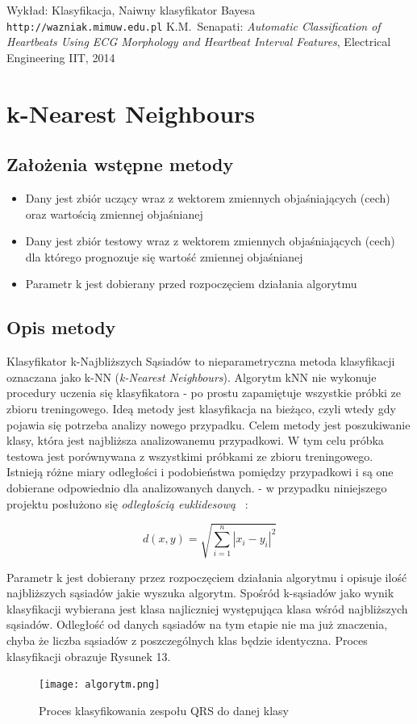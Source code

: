 \documentclass[[10pt,a4paper]{article}
\begin{document}
\begin{thebibliography}{99}
 Wykład: Klasyfikacja, Naiwny klasyfikator Bayesa
\\\texttt{http://wazniak.mimuw.edu.pl}
 K.M.~Senapati:
\emph{Automatic Classification of Heartbeats Using ECG Morphology and Heartbeat Interval Features}, Electrical Engineering IIT, 2014
\end{thebibliography}

\newpage
\section{k-Nearest Neighbours}
\subsection{Założenia wstępne metody} 
\begin{itemize}
\item Dany jest zbiór uczący wraz z wektorem zmiennych objaśniających (cech) oraz wartością zmiennej objaśnianej
\item Dany jest zbiór testowy wraz z wektorem zmiennych objaśniających (cech) dla którego prognozuje się wartość zmiennej objaśnianej
\item Parametr k jest dobierany przed rozpoczęciem działania algorytmu
\end{itemize}

\subsection{Opis metody}
Klasyfikator k-Najbliższych Sąsiadów to nieparametryczna metoda klasyfikacji oznaczana jako k-NN (\emph{k-Nearest Neighbours}). Algorytm kNN nie wykonuje procedury uczenia się klasyfikatora - po prostu zapamiętuje wszystkie próbki ze zbioru treningowego. Ideą metody jest klasyfikacja na bieżąco, czyli wtedy gdy pojawia się potrzeba analizy nowego przypadku. Celem metody jest poszukiwanie klasy, która jest najbliższa analizowanemu przypadkowi. W tym celu próbka testowa jest porównywana z wszystkimi próbkami ze zbioru treningowego. Istnieją różne miary odległości i podobieństwa pomiędzy przypadkowi i są one dobierane odpowiednio dla analizowanych danych. - w przypadku niniejszego projektu posłużono się \emph{odległością euklidesową}  ~\cite{doktorska}:

\[ d(x,y) = \sqrt{\displaystyle\sum_{i=1}^{n} |x_{i} - y_{i}|^{2}} \]

Parametr k jest dobierany przez rozpoczęciem działania algorytmu i opisuje ilość najbliższych sąsiadów jakie wyszuka algorytm. Spośród k-sąsiadów jako wynik klasyfikacji wybierana jest klasa najliczniej występująca klasa wśród najbliższych sąsiadów. Odległość od danych sąsiadów na tym etapie nie ma już znaczenia, chyba że liczba sąsiadów z poszczególnych klas będzie identyczna. Proces klasyfikacji obrazuje Rysunek 13.
\begin{figure}[h]
\centering
\texttt{[image: algorytm.png]}
\caption{Proces klasyfikowania zespołu QRS do danej klasy}
\end{figure}
\end{document}
